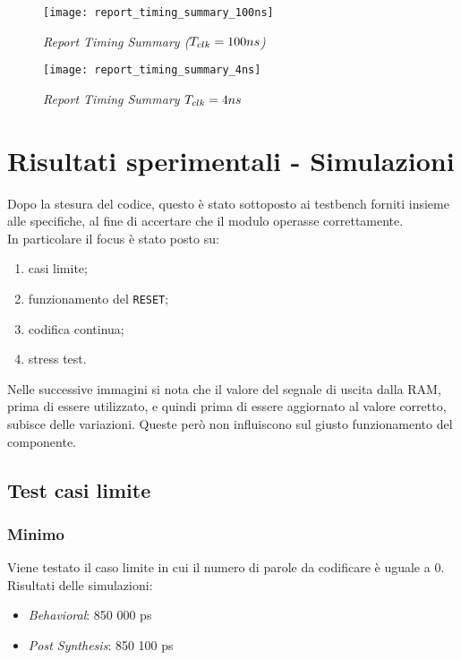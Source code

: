\documentclass{article}
\begin{document}
\begin{figure}[H]
    \centering
    \texttt{[image: report\_timing\_summary\_100ns]}
    \caption{\emph{Report Timing Summary ($T_{\small{clk}} = 100 ns$)}}
    \label{fig:timing100}
\end{figure}

\begin{figure}[h]
    \centering
    \texttt{[image: report\_timing\_summary\_4ns]}
    \caption{\emph{Report Timing Summary $T_{\small{clk}} = 4 ns$}}
    \label{fig:timing4}
\end{figure}


\newpage
\section{Risultati sperimentali - Simulazioni}
Dopo la stesura del codice, questo è stato sottoposto ai testbench forniti insieme alle specifiche, al fine di accertare che il modulo operasse correttamente.
\\In particolare il focus è stato posto su:
\begin{enumerate}
    \item casi limite;
    \item funzionamento del \verb^RESET^;
    \item codifica continua;
    \item stress test.
\end{enumerate}

\vspace{0,3cm}
Nelle successive immagini si nota che il valore del segnale di uscita dalla RAM, prima di essere utilizzato, e quindi prima di essere aggiornato al valore corretto, subisce delle variazioni.
Queste però non influiscono sul giusto funzionamento del componente.

\subsection{Test casi limite}
\subsubsection{Minimo}
Viene testato il caso limite in cui il numero di parole da codificare è uguale a 0.\\
Risultati delle simulazioni:
\begin{itemize}
    \item \emph{Behavioral}: 850 000 ps
    \item \emph{Post Synthesis}: 850 100  ps
\end{itemize}
\end{document}
